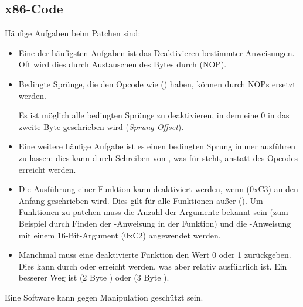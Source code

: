 \label{patching}

\subsection{x86-Code}
\label{x86_patching}

Häufige Aufgaben beim Patchen sind:

\begin{itemize}

\item 
Eine der häufigsten Aufgaben ist das Deaktivieren bestimmter Anweisungen. Oft
wird dies durch Austauschen des Bytes durch  (\ac{NOP}).

\item
Bedingte Sprünge, die den Opcode wie  (\JZ) haben, können durch
\ac{NOP}s ersetzt werden.

Es ist möglich alle bedingten Sprünge zu deaktivieren, in dem eine 0 in das
zweite Byte geschrieben wird (\emph{Sprung-Offset}).

\item 
Eine weitere häufige Aufgabe ist es einen bedingten Sprung immer ausführen zu
lassen: dies kann durch Schreiben von , was für \JMP steht, anstatt des
Opcodes erreicht werden.

\item Die Ausführung einer Funktion kann deaktiviert werden, wenn \RETN (0xC3) an
den Anfang geschrieben wird. Dies gilt für alle Funktionen außer 
().
Um -Funktionen zu patchen muss die Anzahl der Argumente bekannt sein
(zum Beispiel durch Finden der \RETN-Anweisung in der Funktion) und die \RETN-Anweisung
mit einem 16-Bit-Argument (0xC2) angewendet werden.

\item Manchmal muss eine deaktivierte Funktion den Wert 0 oder 1 zurückgeben.
Dies kann durch  oder  erreicht werden, was aber relativ
ausführlich ist.
Ein besserer Weg ist  (2 Byte ) oder 
(3 Byte ).

\end{itemize}

Eine Software kann gegen Manipulation geschützt sein.

